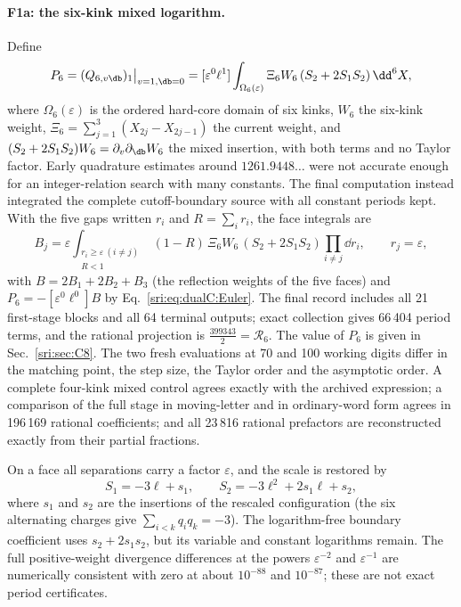 \paragraph{F1a: the six-kink mixed logarithm.} Define
\begin{equation}
 P_6=(Q_{6,v\db})_1\big|_{v=1,\db=0}=[\varepsilon^0\ell^1]\int_{\Omega_6(\varepsilon)}\Xi_6W_6\,(S_2+2S_1S_2)\,\dd^6X,
\end{equation}
where $\Omega_6(\varepsilon)$ is the ordered hard-core domain of six kinks, $W_6$ the six-kink weight,
$\Xi_6=\sum_{j=1}^3(X_{2j}-X_{2j-1})$ the current weight, and $(S_2+2S_1S_2)W_6=\partial_v\partial_{\db}W_6$ the
mixed insertion, with both terms and no Taylor factor. Early quadrature estimates around $1261.9448\ldots$ were
not accurate enough for an integer-relation search with many constants. The final computation instead integrated the
complete cutoff-boundary source with all constant periods kept. With the five gaps written $r_i$ and $R=\sum_ir_i$,
the face integrals are
\begin{equation}
 B_j=\varepsilon\int_{\substack{r_i\ge\varepsilon\ (i\ne j)\\ R<1}}(1-R)\,\Xi_6W_6\,(S_2+2S_1S_2)\prod_{i\ne j}\dd r_i,
 \qquad r_j=\varepsilon,
\end{equation}
with $B=2B_1+2B_2+B_3$ (the reflection weights of the five faces) and $P_6=-[\varepsilon^0\ell^0]B$ by
Eq.~\eqref{sri:eq:dualC:Euler}. The final record includes all 21 first-stage blocks and all 64 terminal outputs; exact
collection gives 66\,404 period terms, and the rational projection is $\frac{399343}{2}=\mathcal R_6$. The
value of $P_6$ is given in Sec.~\ref{sri:sec:C8}. The two fresh evaluations at 70 and 100 working digits differ in the
matching point, the step size, the Taylor order and the asymptotic order. A complete four-kink mixed control agrees
exactly with the archived expression; a comparison of the full stage in moving-letter and in ordinary-word form agrees
in 196\,169 rational coefficients; and all 23\,816 rational prefactors are reconstructed exactly from their partial
fractions.

On a face all separations carry a factor $\varepsilon$, and the scale is restored by
\begin{equation}
 S_1=-3\ell+s_1,\qquad S_2=-3\ell^2+2s_1\ell+s_2,
\end{equation}
where $s_1$ and $s_2$ are the insertions of the rescaled configuration (the six alternating charges give
$\sum_{i<k}q_iq_k=-3$). The logarithm-free boundary coefficient uses $s_2+2s_1s_2$, but its variable and constant
logarithms remain. The full positive-weight divergence differences at the powers $\varepsilon^{-2}$ and
$\varepsilon^{-1}$ are numerically consistent with zero at about $10^{-88}$ and $10^{-87}$; these are not exact period
certificates.

